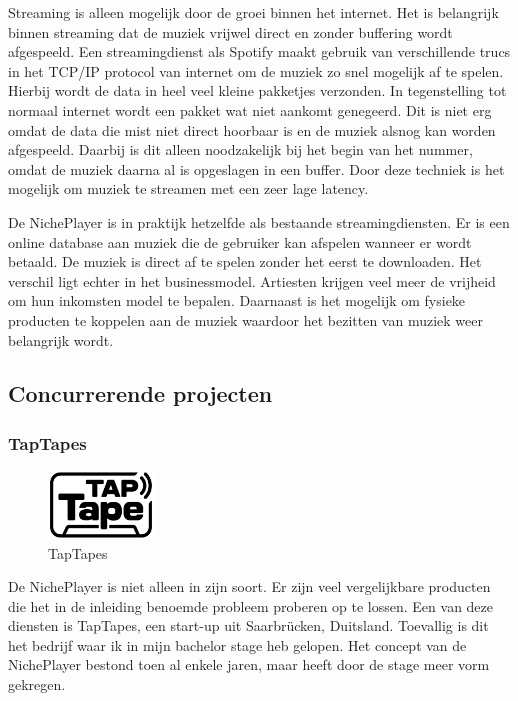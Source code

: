 Streaming is alleen mogelijk door de groei binnen het internet. Het is belangrijk binnen streaming dat de muziek vrijwel direct en zonder buffering wordt afgespeeld. Een streamingdienst als Spotify maakt gebruik van verschillende trucs in het TCP/IP protocol van internet om de muziek zo snel mogelijk af te spelen. Hierbij wordt de data in heel veel kleine pakketjes verzonden. In tegenstelling tot normaal internet wordt een pakket wat niet aankomt genegeerd. Dit is niet erg omdat de data die mist niet direct hoorbaar is en de muziek alsnog kan worden afgespeeld. Daarbij is dit alleen noodzakelijk bij het begin van het nummer, omdat de muziek daarna al is opgeslagen in een buffer. Door deze techniek is het mogelijk om muziek te streamen met een zeer lage latency.

De NichePlayer is in praktijk hetzelfde als bestaande streamingdiensten. Er is een online database aan muziek die de gebruiker kan afspelen wanneer er wordt betaald. De muziek is direct af te spelen zonder het eerst te downloaden. Het verschil ligt echter in het businessmodel. Artiesten krijgen veel meer de vrijheid om hun inkomsten model te bepalen. Daarnaast is het mogelijk om fysieke producten te koppelen aan de muziek waardoor het bezitten van muziek weer belangrijk wordt.

\subsection{Concurrerende projecten}
\subsubsection*{TapTapes}
\begin{figure}
    \centering
    \includegraphics[width=0.25\textwidth]{assets/critical-review/TapTapes.png}
    \caption{TapTapes}
    \label{fig:critical-review:TapTapes}
\end{figure}
De NichePlayer is niet alleen in zijn soort. Er zijn veel vergelijkbare producten die het in de inleiding benoemde probleem proberen op te lossen. Een van deze diensten is TapTapes, een start-up uit Saarbrücken, Duitsland. Toevallig is dit het bedrijf waar ik in mijn bachelor stage heb gelopen. Het concept van de NichePlayer bestond toen al enkele jaren, maar heeft door de stage meer vorm gekregen.

